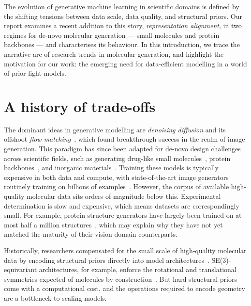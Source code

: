 \documentclass[12pt,a4paper,twoside]{report}
\begin{document}
\label{firstcontentpage}



The evolution of generative machine learning in scientific domains is defined by the shifting tensions between data scale, data quality, and structural priors. Our report examines a recent addition to this story, \emph{representation alignment}, in two regimes for de-novo molecular generation --- small molecules and protein backbones --- and characterises its behaviour. In this introduction, we trace the narrative arc of research trends in molecular generation, and highlight the motivation for our work: the emerging need for data-efficient modelling in a world of prior-light models.

\section{A history of trade-offs}

The dominant ideas in generative modelling are \emph{denoising diffusion} and its offshoot \emph{flow matching}~\cite{DDPM,FlowMatching}, which found breakthrough success in the realm of image generation. This paradigm has since been adapted for de-novo design challenges across scientific fields, such as generating drug-like small molecules~\cite{Tabasco}, protein backbones~\cite{RFdiffusion,Chroma,Proteina}, and inorganic materials~\cite{MatterGen}. Training these models is typically expensive in both data and compute, with state-of-the-art image generators routinely training on billions of examples~\cite{LAION5B}. However, the corpus of available high-quality molecular data sits orders of magnitude below this. Experimental determination is slow and expensive, which means datasets are correspondingly small. For example, protein structure generators have largely been trained on at most half a million structures~\cite{Proteina}, which may explain why they have not yet matched the maturity of their vision-domain counterparts.

Historically, researchers compensated for the small scale of high-quality molecular data by encoding structural priors directly into model architectures~\cite{BronsteinGDL}. SE(3)-equivariant architectures, for example, enforce the rotational and translational symmetries expected of molecules by construction~\cite{ThomasTFN}. But hard structural priors come with a computational cost, and the operations required to encode geometry are a bottleneck to scaling models.
\end{document}
